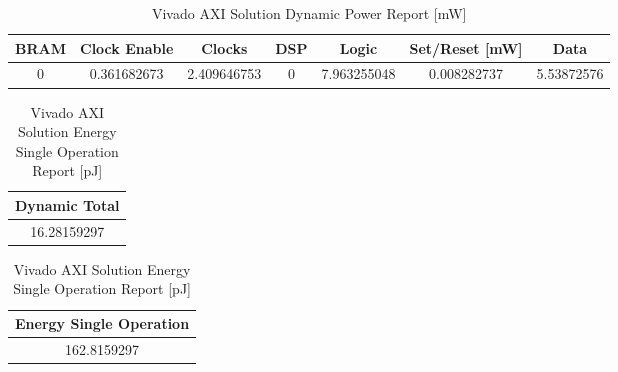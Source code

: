 \begin{table}[H]
	\centering
	\begin{tabular}{|c|c|c|c|c|c|c|}
		\hline
		\textbf{BRAM} & \textbf{Clock Enable} & \textbf{Clocks} & \textbf{DSP} & \textbf{Logic} & \textbf{Set/Reset} [mW] & \textbf{Data} \\
		\hline
		0 & 0.361682673 & 2.409646753 & 0 & 7.963255048 & 0.008282737 & 5.53872576 \\
		\hline
	\end{tabular}
	\caption{Vivado AXI Solution Dynamic Power Report [mW]}
	\label{tab:vivado-axi-solution-dynamic-power-report}
\end{table}

\begin{table}[H]
	\centering
	\begin{minipage}[t]{0.45\linewidth}
		\centering
		\begin{tabular}{|c|}
			\hline
			\textbf{Dynamic Total} \\
			\hline
			16.28159297 \\
			\hline
		\end{tabular}
		\caption{Vivado AXI Solution Dynamic Power Report [mW]}
		\label{tab:vivado-axi-solution-total-dynamic-power-report}
	\end{minipage}
	\hfill
	\centering
	\begin{minipage}[t]{0.45\linewidth}
		\centering
		\begin{tabular}{|c|}
			\hline
			\textbf{Energy Single Operation} \\
			\hline
			162.8159297 \\
			\hline
		\end{tabular}
		\caption{Vivado AXI Solution Energy Single Operation Report [pJ]}
		\label{tab:vivado-axi-solution-energy-single-operation-report}
	\end{minipage}
\end{table}